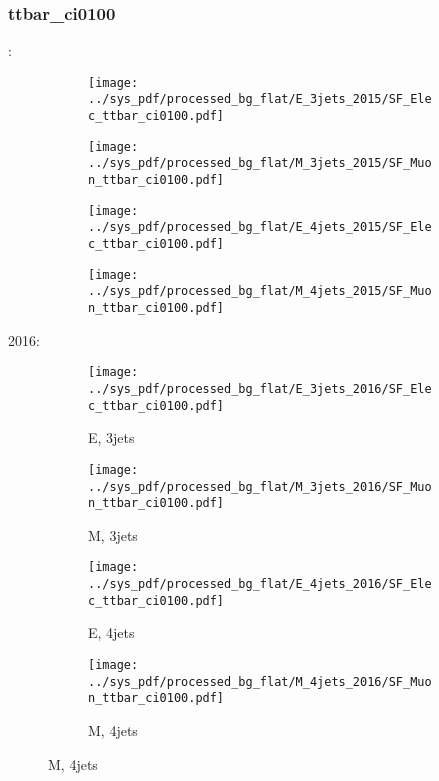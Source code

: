 \documentclass{beamer}
\begin{document}
\begin{frame}
\frametitle{ttbar_ci0100}
\fontsize{5}{1}:
\begin{figure}
\centering
\begin{subfigure}[b]{0.24\textwidth}
\texttt{[image: ../sys\_pdf/processed\_bg\_flat/E\_3jets\_2015/SF\_Elec\_ttbar\_ci0100.pdf]}
\end{subfigure}
\begin{subfigure}[b]{0.24\textwidth}
\texttt{[image: ../sys\_pdf/processed\_bg\_flat/M\_3jets\_2015/SF\_Muon\_ttbar\_ci0100.pdf]}
\end{subfigure}
\begin{subfigure}[b]{0.24\textwidth}
\texttt{[image: ../sys\_pdf/processed\_bg\_flat/E\_4jets\_2015/SF\_Elec\_ttbar\_ci0100.pdf]}
\end{subfigure}
\begin{subfigure}[b]{0.24\textwidth}
\texttt{[image: ../sys\_pdf/processed\_bg\_flat/M\_4jets\_2015/SF\_Muon\_ttbar\_ci0100.pdf]}
\end{subfigure}
\end{figure}
2016:
\begin{figure}
\centering
\begin{subfigure}[b]{0.24\textwidth}
\texttt{[image: ../sys\_pdf/processed\_bg\_flat/E\_3jets\_2016/SF\_Elec\_ttbar\_ci0100.pdf]}
\captionsetup{font=tiny}
\caption{E, 3jets}
\end{subfigure}
\begin{subfigure}[b]{0.24\textwidth}
\texttt{[image: ../sys\_pdf/processed\_bg\_flat/M\_3jets\_2016/SF\_Muon\_ttbar\_ci0100.pdf]}
\captionsetup{font=tiny}
\caption{M, 3jets}
\end{subfigure}
\begin{subfigure}[b]{0.24\textwidth}
\texttt{[image: ../sys\_pdf/processed\_bg\_flat/E\_4jets\_2016/SF\_Elec\_ttbar\_ci0100.pdf]}
\captionsetup{font=tiny}
\caption{E, 4jets}
\end{subfigure}
\begin{subfigure}[b]{0.24\textwidth}
\texttt{[image: ../sys\_pdf/processed\_bg\_flat/M\_4jets\_2016/SF\_Muon\_ttbar\_ci0100.pdf]}
\captionsetup{font=tiny}
\caption{M, 4jets}
\end{subfigure}
\end{figure}
\end{frame}
\end{document}
